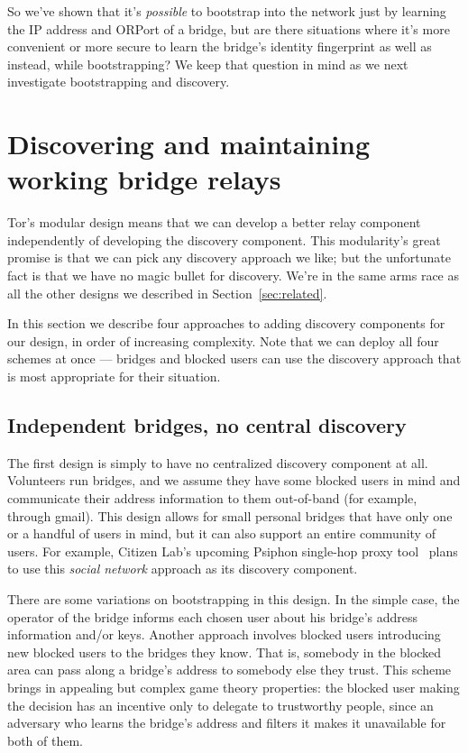 \documentclass{llncs}
\begin{document}
So we've shown that it's \emph{possible} to bootstrap into the network
just by learning the IP address and ORPort of a bridge, but are there
situations where it's more convenient or more secure to learn the bridge's
identity fingerprint as well as instead, while bootstrapping? We keep
that question in mind as we next investigate bootstrapping and discovery.

\section{Discovering and maintaining working bridge relays}
\label{sec:discovery}

Tor's modular design means that we can develop a better relay component
independently of developing the discovery component. This modularity's
great promise is that we can pick any discovery approach we like; but the
unfortunate fact is that we have no magic bullet for discovery. We're
in the same arms race as all the other designs we described in
Section~\ref{sec:related}.

In this section we describe four approaches to adding discovery
components for our design, in order of increasing complexity. Note that
we can deploy all four schemes at once --- bridges and blocked users can
use the discovery approach that is most appropriate for their situation.

\subsection{Independent bridges, no central discovery}

The first design is simply to have no centralized discovery component at
all. Volunteers run bridges, and we assume they have some blocked users
in mind and communicate their address information to them out-of-band
(for example, through gmail). This design allows for small personal
bridges that have only one or a handful of users in mind, but it can
also support an entire community of users. For example, Citizen Lab's
upcoming Psiphon single-hop proxy tool~\cite{psiphon} plans to use this
\emph{social network} approach as its discovery component.

There are some variations on bootstrapping in this design. In the simple
case, the operator of the bridge informs each chosen user about his
bridge's address information and/or keys. Another approach involves
blocked users introducing new blocked users to the bridges they know.
That is, somebody in the blocked area can pass along a bridge's address to
somebody else they trust. This scheme brings in appealing but complex game
theory properties: the blocked user making the decision has an incentive
only to delegate to trustworthy people, since an adversary who learns
the bridge's address and filters it makes it unavailable for both of them.
\end{document}
